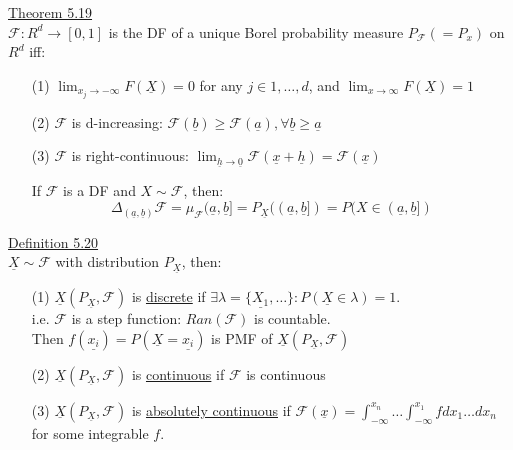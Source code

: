 \documentclass[10pt,letterpaper]{article}
\begin{document}
\underline{Theorem 5.19}\\

$\mathcal{F}:R^d\rightarrow[0,1]$ is the DF of a unique Borel probability measure $P_\mathcal{F}(=P_x)$ on $R^d$ iff:

\begin{enumerate}

\item[(1)] $\lim_{x_j\rightarrow -\infty}F(\underline{X})=0$ for any $j\in{1,\dots, d}$, and $\lim_{x\rightarrow\infty}F(\underline{X})=1$

\item[(2)] $\mathcal{F}$ is d-increasing: $\mathcal{F}(\underline{b})\geq \mathcal{F}(\underline{a}), \forall\underline{b}\geq\underline{a}$

\item[(3)] $\mathcal{F}$ is right-continuous: $\lim_{\underline{h}\rightarrow\underline{0}}\mathcal{F}(\underline{x}+\underline{h})=\mathcal{F}(\underline{x})$

If $\mathcal{F}$ is a DF and $X\sim\mathcal{F}$, then:
$$\Delta_{(\underline{a},\underline{b})}\mathcal{F}=\mu_{\mathcal{F}}(\underline{a},\underline{b}]=P_{\underline{X}}((\underline{a},\underline{b}])=P(X\in(\underline{a},\underline{b}])$$

\end{enumerate}

\underline{Definition 5.20}\\

$\underline{X}\sim\mathcal{F}$ with distribution $P_{\underline{X}}$, then:

\begin{enumerate}

\item[(1)] $\underline{X}(P_{\underline{X}},\mathcal{F})$ is \underline{discrete} if $\exists\lambda=\{\underline{X_1},\dots\}:P(\underline{X}\in\lambda)=1$.\\

i.e. $\mathcal{F}$ is a step function: $Ran(\mathcal{F})$ is countable.\\

Then $f(\underline{x_i})=P(\underline{X}=\underline{x_i})$ is PMF of $\underline{X}(P_{\underline{X}}, \mathcal{F})$

\item[(2)] $\underline{X}(P_{\underline{X}}, \mathcal{F})$ is \underline{continuous} if $\mathcal{F}$ is continuous

\item[(3)] $\underline{X}(P_{\underline{X}}, \mathcal{F})$ is \underline{absolutely continuous} if $\mathcal{F}(\underline{x})=\int_{-\infty}^{x_n}\dots\int_{-\infty}^{x_1}fdx_1\dots dx_n$ for some integrable $f$.

\end{enumerate}
\end{document}
